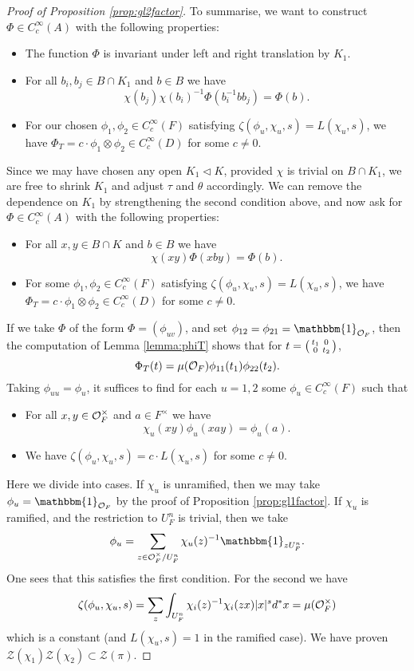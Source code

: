 \begin{proof}[Proof of Proposition \ref{prop:gl2factor}]
    To summarise, we want to construct $\Phi \in C_c^\infty(A)$ with the following properties:
    \begin{itemize}
        \item The function $\Phi$ is invariant under left and right translation by $K_1$.
        \item For all $b_i,b_j \in B \cap K_1$ and $b \in B$ we have $$\chi(b_j)\chi(b_i)^{-1}\Phi(b_i^{-1}bb_j) = \Phi(b).$$
        \item For our chosen $\phi_1,\phi_2 \in C_c^\infty(F)$ satisfying $\zeta(\phi_u,\chi_u,s)=L(\chi_u,s)$, we have $\Phi_T = c \cdot \phi_1 \otimes \phi_2 \in C_c^\infty(D)$ for some $c \neq 0$.
    \end{itemize}
    Since we may have chosen any open $K_1 \lhd K$, provided $\chi$ is trivial on $B \cap K_1$, we are free to shrink $K_1$ and adjust $\tau$ and $\theta$ accordingly. We can remove the dependence on $K_1$ by strengthening the second condition above, and now ask for $\Phi \in C_c^\infty(A)$ with the following properties:
    \begin{itemize}
        \item For all $x,y \in B \cap K$ and $b \in B$ we have $$\chi(xy)\Phi(xby) = \Phi(b).$$
        \item For some $\phi_1,\phi_2 \in C_c^\infty(F)$ satisfying $\zeta(\phi_u,\chi_u,s)=L(\chi_u,s)$, we have $\Phi_T = c \cdot \phi_1 \otimes \phi_2 \in C_c^\infty(D)$ for some $c \neq 0$.
    \end{itemize}
    If we take $\Phi$ of the form $\Phi=(\phi_{uv})$, and set $\phi_{12}=\phi_{21}=\mathbbm{1}_{\mathcal O_F}$, then the computation of Lemma \ref{lemma:phiT} shows that for $t= \begin{psmallmatrix}
        t_1&0\\0&t_2
    \end{psmallmatrix}$,
    $$\Phi_T(t) = \mu(\mathcal{O}_F)\phi_{11}(t_1)\phi_{22}(t_2).$$
    Taking $\phi_{uu}=\phi_u$, it suffices to find for each $u=1,2$ some $\phi_u \in C_c^\infty(F)$ such that
    \begin{itemize}
        \item For all $x,y \in \mathcal{O}_F^\times$ and $a \in F^\times$ we have $$\chi_u(xy)\phi_u(xay) = \phi_u(a).$$
        \item We have $\zeta(\phi_u,\chi_u,s)=c \cdot L(\chi_u,s)$ for some $c \neq 0$.
    \end{itemize}
    Here we divide into cases. If $\chi_u$ is unramified, then we may take $\phi_u = \mathbbm{1}_{\cO_F}$ by the proof of Proposition \ref{prop:gl1factor}. If $\chi_u$ is ramified, and the restriction to $U_F^n$ is trivial, then we take 
    $$ \phi_u = \sum\limits_{z \in \cO_F^\times/U_F^n} \chi_u(z)^{-1} \mathbbm{1}_{zU_F^n}.$$ One sees that this satisfies the first condition. For the second we have 
    $$\zeta(\phi_u,\chi_u,s) = \sum\limits_z \int_{U_F^n} \chi_i(z)^{-1}\chi_i(zx)|x|^s d^*x = \mu(\mathcal{O}_F^\times)$$ which is a constant (and $L(\chi_u,s)=1$ in the ramified case). We have proven $\mathcal Z(\chi_1)\mathcal Z(\chi_2) \subset \mathcal Z(\pi)$.
\end{proof}

